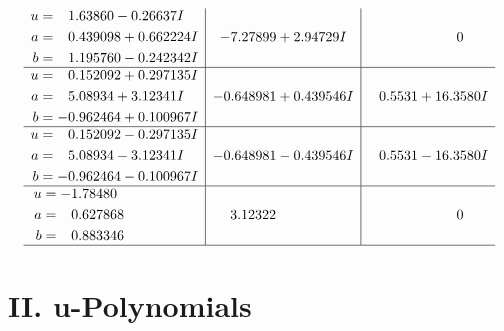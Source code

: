 \documentclass[1p]{elsarticle_modified}
\theoremstyle{definition}
\begin{document}
$$\begin{array}{c|c|c}
\begin{aligned}
u &= \phantom{-}1.63860 - 0.26637 I \\
a &= \phantom{-}0.439098 + 0.662224 I \\
b &= \phantom{-}1.195760 - 0.242342 I\end{aligned}
 & -7.27899 + 2.94729 I & \phantom{-0.000000 } 0 \\ \hline\begin{aligned}
u &= \phantom{-}0.152092 + 0.297135 I \\
a &= \phantom{-}5.08934 + 3.12341 I \\
b &= -0.962464 + 0.100967 I\end{aligned}
 & -0.648981 + 0.439546 I & \phantom{-}0.5531 + 16.3580 I \\ \hline\begin{aligned}
u &= \phantom{-}0.152092 - 0.297135 I \\
a &= \phantom{-}5.08934 - 3.12341 I \\
b &= -0.962464 - 0.100967 I\end{aligned}
 & -0.648981 - 0.439546 I & \phantom{-}0.5531 - 16.3580 I \\ \hline\begin{aligned}
u &= -1.78480\phantom{ +0.000000I} \\
a &= \phantom{-}0.627868\phantom{ +0.000000I} \\
b &= \phantom{-}0.883346\phantom{ +0.000000I}\end{aligned}
 & \phantom{-}3.12322\phantom{ +0.000000I} & \phantom{-0.000000 } 0\\
 \hline 
 \end{array}$$\newpage
\newpage\renewcommand{\arraystretch}{1}
\centering \section*{ II. u-Polynomials}
\end{document}
